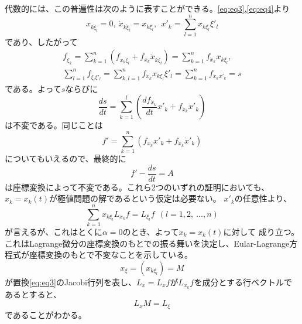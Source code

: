 \documentclass[dvipdfmx, leqno]{jsbook}
\begin{document}
    代数的には、この普遍性は次のように表すことができる。\eqref{eq:eq3},\eqref{eq:eq4}より
\begin{equation}
    x_{k\dot{\xi}_l}= 0,\ \dot{x}_{k\dot{\xi}_l}= x_{k\xi_l},\ \ x'_k= \sum_{l= 1}^n x_{k\xi_l}\xi'_l
\end{equation}
    であり、したがって
\begin{align}
    f_{\dot{\xi}_k}= \sum_{k= 1}^n (f_{x_k\dot{\xi}_l}+ f_{\dot{x_k}}\dot{x}_{k\dot{\xi}_l})= \sum_{k= 1}^n f_{\dot{x}_k}x_{k\xi_l},\\
    \sum_{l= 1}^n f_{\dot{\xi}_l\xi'_l}= \sum_{k, l= 1}^n f_{\dot{x}_k}x_{k\xi_l}\xi'_l= \sum_{k= 1}^n f_{\dot{x}_kx'_k}= s
\end{align}
    である。よって$s$ならびに
\begin{equation}
    \frac{ds}{dt}= \sum_{k= 1}^l \left(\frac{df_{\dot{x}_k}}{dt}x'_k+ f_{\dot{x}_k}\dot{x}'_k\right)
\end{equation}
    は不変である。同じことは
\begin{equation}
    f'= \sum_{k= 1}^n (f_{x_k}x'_k+ f_{\dot{x}_k}\dot{x}'_k)
\end{equation}
    についてもいえるので、最終的に
\begin{equation}
    f'- \frac{ds}{dt}= A
\end{equation}
    は座標変換によって不変である。これら2つのいずれの証明においても、$x_k= x_k(t)$が極値問題の解であるという仮定は必要ない。
    $x'_k$の任意性より、
\begin{equation}
    \sum_{k= 1}^n x_{k\xi_l}L_{x_k}f= L_{\xi_l}f\ \ (l =1, 2,\ \ldots, n)
\end{equation}
    が言えるが、これはとくに$\alpha= 0$のとき、よって$x_k= x_k(t)$に対して
    成り立つ。これはLagrange微分の座標変換のもとでの振る舞いを決定し、Eular-Lagrange方程式が座標変換のもとで不変なことを示している。
\begin{equation}
    x_\xi= (x_{k\xi_l})= M
\end{equation}
    が置換\eqref{eq:eq3}のJacobi行列を表し、$L_x= L_xf$が$L_{x_k}f$を成分とする行ベクトルであるとすると、
\begin{equation}
    L_xM= L_\xi
\end{equation}
    であることがわかる。
\end{document}
